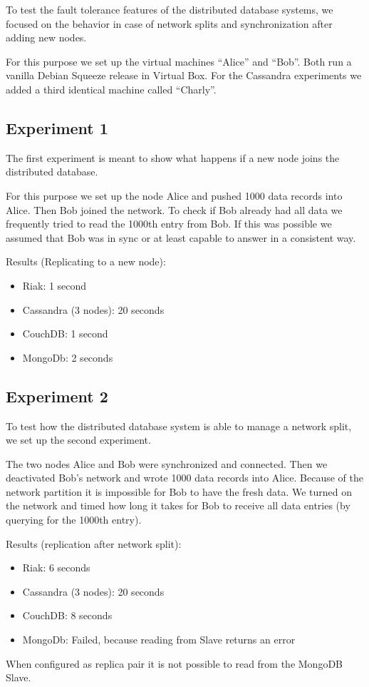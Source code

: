 \documentclass{llncs}
\begin{document}
To test the fault tolerance features of the distributed database
systems, we focused on the behavior in case of network splits and
synchronization after adding new nodes.

For this purpose we set up the virtual machines ``Alice'' and
``Bob''. Both run a vanilla Debian Squeeze release in Virtual Box.
For the Cassandra experiments we added a third identical machine
called ``Charly''.

\subsection{Experiment 1}

The first experiment is meant to show what happens if a new node
joins the distributed database.

For this purpose we set up the node Alice and pushed 1000 data
records into Alice. Then Bob joined the network. To check if Bob
already had all data we frequently tried to read the 1000th entry
from Bob. If this was possible we assumed that Bob was in sync or
at least capable to answer in a consistent way.

Results (Replicating to a new node):

\begin{itemize}
\item
  Riak: 1 second
\item
  Cassandra (3 nodes): 20 seconds
\item
  CouchDB: 1 second
\item
  MongoDb: 2 seconds
\end{itemize}
\subsection{Experiment 2}

To test how the distributed database system is able to manage a
network split, we set up the second experiment.

The two nodes Alice and Bob were synchronized and connected. Then
we deactivated Bob's network and wrote 1000 data records into
Alice. Because of the network partition it is impossible for Bob to
have the fresh data. We turned on the network and timed how long it
takes for Bob to receive all data entries (by querying for the
1000th entry).

Results (replication after network split):

\begin{itemize}
\item
  Riak: 6 seconds
\item
  Cassandra (3 nodes): 20 seconds
\item
  CouchDB: 8 seconds
\item
  MongoDb: Failed, because reading from Slave returns an error
\end{itemize}
When configured as replica pair it is not possible to read from the
MongoDB Slave.
\end{document}
